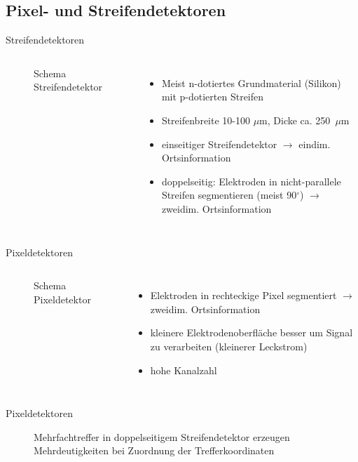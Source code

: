 \subsection[]{Pixel- und Streifendetektoren}


\begin{frame}{Streifendetektoren}
	\begin{columns}[T]
			\begin{figure}[htbp]
			  \centering
			   
			  \caption{Schema Streifendetektor}
			\end{figure}
	    	\begin{itemize}
			  \item Meist n-dotiertes Grundmaterial (Silikon) mit p-dotierten Streifen
			  \item Streifenbreite 10-100 $\mu$m, Dicke ca. 250~$\mu$m
			  \item einseitiger Streifendetektor $\rightarrow$ eindim. Ortsinformation
			  \item doppelseitig: Elektroden in nicht-parallele Streifen segmentieren (meist 90$^\circ$)
			  $\rightarrow$ zweidim. Ortsinformation
			\end{itemize}
    \end{columns}
\end{frame}

\begin{frame}{Pixeldetektoren}
	\begin{columns}[T]
			\begin{figure}[htbp]
			  \centering
			  
			  \caption{Schema Pixeldetektor}
			\end{figure}	
	    	\begin{itemize}
			  \item Elektroden in rechteckige Pixel segmentiert $\rightarrow$ zweidim. Ortsinformation
			  \item kleinere Elektrodenoberfläche besser um Signal zu verarbeiten (kleinerer Leckstrom)
			  \item hohe Kanalzahl
			\end{itemize}
    \end{columns}
\end{frame}


\begin{frame}{Pixeldetektoren}
			\begin{figure}[htbp]
			  \centering
			  
			  \caption{Mehrfachtreffer in doppelseitigem Streifendetektor erzeugen Mehrdeutigkeiten bei Zuordnung
			der Trefferkoordinaten}
			\end{figure}
			 \vspace{1cm}
\end{frame}


